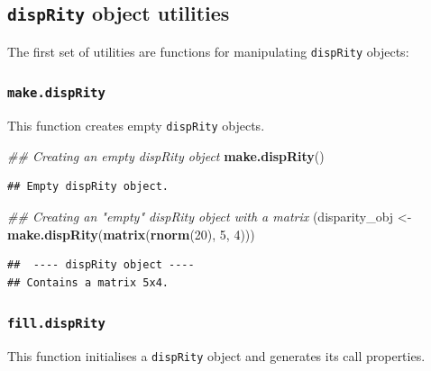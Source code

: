 \documentclass[
]{book}
\newenvironment{Shaded}{\begin{snugshade}}{\end{snugshade}}
\newcommand{\CommentTok}[1]{\textcolor[rgb]{0.56,0.35,0.01}{\textit{#1}}}
\newcommand{\DecValTok}[1]{\textcolor[rgb]{0.00,0.00,0.81}{#1}}
\newcommand{\KeywordTok}[1]{\textcolor[rgb]{0.13,0.29,0.53}{\textbf{#1}}}
\newcommand{\NormalTok}[1]{#1}
\newcommand{\StringTok}[1]{\textcolor[rgb]{0.31,0.60,0.02}{#1}}
\begin{document}
\hypertarget{disprity-object-utilities}{%
\subsection{\texorpdfstring{\texttt{dispRity} object utilities }{dispRity object utilities }}\label{disprity-object-utilities}}

The first set of utilities are functions for manipulating \texttt{dispRity} objects:

\hypertarget{make.disprity}{%
\subsubsection{\texorpdfstring{\texttt{make.dispRity}}{make.dispRity}}\label{make.disprity}}

This function creates empty \texttt{dispRity} objects.

\begin{Shaded}
\begin{Highlighting}[]
\CommentTok{\#\# Creating an empty dispRity object}
\KeywordTok{make.dispRity}\NormalTok{()}
\end{Highlighting}
\end{Shaded}

\begin{verbatim}
## Empty dispRity object.
\end{verbatim}

\begin{Shaded}
\begin{Highlighting}[]
\CommentTok{\#\# Creating an "empty" dispRity object with a matrix}
\NormalTok{(disparity\_obj \textless{}{-}}\StringTok{ }\KeywordTok{make.dispRity}\NormalTok{(}\KeywordTok{matrix}\NormalTok{(}\KeywordTok{rnorm}\NormalTok{(}\DecValTok{20}\NormalTok{), }\DecValTok{5}\NormalTok{, }\DecValTok{4}\NormalTok{)))}
\end{Highlighting}
\end{Shaded}

\begin{verbatim}
##  ---- dispRity object ---- 
## Contains a matrix 5x4.
\end{verbatim}

\hypertarget{fill.disprity}{%
\subsubsection{\texorpdfstring{\texttt{fill.dispRity}}{fill.dispRity}}\label{fill.disprity}}

This function initialises a \texttt{dispRity} object and generates its call properties.
\end{document}
